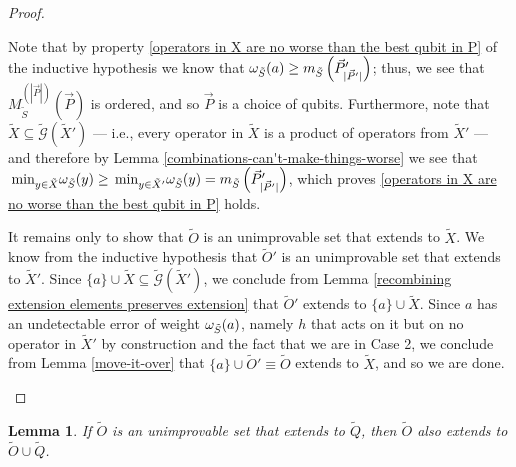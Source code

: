 \documentclass[twocolumn,showpacs,preprintnumbers,amsmath,amssymb,nofootinbib,pra,floatfix]{revtex4-1}
\newtheorem{lemma}{Lemma}
\newcommand{\lst}{\vec}
\newcommand{\set}{\tilde}
\newcommand{\genfun}{\tilde{\mathcal{G}}}
\begin{document}
\begin{proof}
\begin{description}
Note that by property \ref{operators in X are no worse than the best qubit in P} of the inductive hypothesis we know that $\om_{\set S}(a)\ge m_{\set S}\paren{\lst P'_{|\lst P'|}}$;  thus, we see that $M^{(|\lst P|)}_{\set S}(\lst P)$ is ordered, and so $\lst P$ is a choice of qubits.  Furthermore, note that $\set X\subseteq \genfun(\set X')$ --- i.e., every operator in $\set X$ is a product of operators from $\set X'$ --- and therefore by Lemma \ref{combinations-can't-make-things-worse} we see that $\min_{y\in\set X}\om_{\set S}(y)\ge \min_{y\in\set X'}\om_{\set S}(y)=m_{\set S}\paren{\lst P'_{|\lst P'|}}$, which proves \ref{operators in X are no worse than the best qubit in P} holds.

It remains only to show that $\set O$ is an unimprovable set that extends to $\set X$.  We know from the inductive hypothesis that $\set O'$ is an unimprovable set that extends to $\set X'$.  Since $\{a\}\cup\set X\subseteq \genfun(\set X')$, we conclude from Lemma \ref{recombining extension elements preserves extension} that $\set O'$ extends to $\{a\}\cup\set X$.  Since $a$ has an undetectable error of weight $\om_{\set S}(a)$, namely $h$ that acts on it but on no operator in $\set X'$ by construction and the fact that we are in Case 2, we conclude from Lemma \ref{move-it-over} that $\{a\}\cup \set O'\equiv \set O$ extends to $\set X$, and so we are done.
\end{description}

\end{proof}
\begin{lemma}
\label{lemma:unimprovable sets extend to themselves}
If $\set O$ is an unimprovable set that extends to $\set Q$, then $\set O$ also extends to $\set O\cup\set Q$.
\end{lemma}
\end{document}
